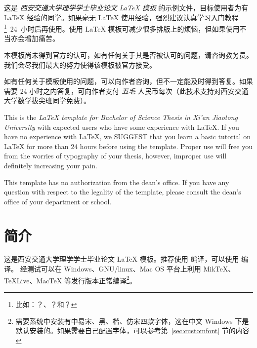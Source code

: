 \documentclass[%
               amsthm,
              ]{xjtubsc}
\begin{document}
\begin{abstractcn} %
这是 \emph{西安交通大学理学学士毕业论文 \LaTeX{} 模板} 的示例文件，目标使用者为有 \LaTeX{} 经验的同学。如果毫无 \LaTeX{} 使用经验，强烈建议认真学习入门教程\footnote{比如：？、？和？}~24~小时后再使用。使用 LaTeX 模板可减少很多排版上的烦恼，但如果使用不当亦会增加痛苦。

本模板尚未得到官方的认可，如有任何关于其是否被认可的问题，请咨询教务员。我们会尽我们最大的努力使得该模板被官方接受。

如有任何关于模板使用的问题，可以向作者咨询，但不一定能及时得到答复。如果需要 24 小时之内答复，可向作者支付 \emph{五毛} 人民币每次（此技术支持对西安交通大学数学拔尖班同学免费）。

\end{abstractcn}


\begin{abstracten} %

This is the \emph{\LaTeX{} template for Bachelor of Science Thesis in Xi'an Jiaotong University} with expected users who have some experience with \LaTeX{}. If you have no experience with \LaTeX{}, we SUGGEST that you learn a basic tutorial on \LaTeX{} for more than 24 hours before using the template. Proper use will free you from the worries of typography of your thesis, however, improper use will definitely increasing your pain.

This template has no authorization from the dean's office. If you have any question with respect to the legality of the template, please consult the dean's office of your department or school.

\end{abstracten}


\tableofcontents %


\mainmatter


\section{简介}
这是西安交通大学理学学士毕业论文 \LaTeX{} 模板。推荐使用  编译，可以使用  编译。
经测试可以在 Windows、GNU/linux、Mac OS 平台上利用 MikTeX、TeXLive、MacTeX 等发行版本正常编译\footnote{需要系统中安装有中易宋、黑、楷、仿宋四款字体，这在中文 Windows 下是默认安装的。如果需要自己配置字体，可以参考第~\ref{sec:customfont} 节的内容}。
\end{document}
